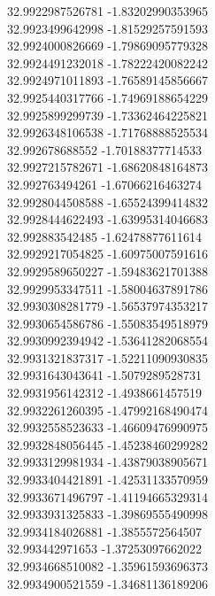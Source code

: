 {32.9922987526781	-1.83202990353965\\
32.9923499642998	-1.81529257591593\\
32.9924000826669	-1.79869095779328\\
32.9924491232018	-1.78222420082242\\
32.9924971011893	-1.76589145856667\\
32.9925440317766	-1.74969188654229\\
32.9925899299739	-1.73362464225821\\
32.9926348106538	-1.71768888525534\\
32.992678688552	-1.70188377714533\\
32.9927215782671	-1.68620848164873\\
32.992763494261	-1.67066216463274\\
32.9928044508588	-1.65524399414832\\
32.9928444622493	-1.63995314046683\\
32.992883542485	-1.62478877611614\\
32.9929217054825	-1.60975007591616\\
32.9929589650227	-1.59483621701388\\
32.9929953347511	-1.58004637891786\\
32.9930308281779	-1.56537974353217\\
32.9930654586786	-1.55083549518979\\
32.9930992394942	-1.53641282068554\\
32.9931321837317	-1.52211090930835\\
32.9931643043641	-1.5079289528731\\
32.9931956142312	-1.4938661457519\\
32.9932261260395	-1.47992168490474\\
32.9932558523633	-1.46609476990975\\
32.9932848056445	-1.45238460299282\\
32.9933129981934	-1.43879038905671\\
32.9933404421891	-1.42531133570959\\
32.9933671496797	-1.41194665329314\\
32.9933931325833	-1.39869555490998\\
32.9934184026881	-1.3855572564507\\
32.993442971653	-1.37253097662022\\
32.9934668510082	-1.35961593696373\\
32.9934900521559	-1.34681136189206\\
}
